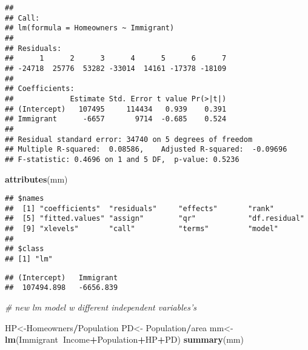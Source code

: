 \documentclass[
]{article}
\newenvironment{Shaded}{\begin{snugshade}}{\end{snugshade}}
\newcommand{\CommentTok}[1]{\textcolor[rgb]{0.56,0.35,0.01}{\textit{#1}}}
\newcommand{\KeywordTok}[1]{\textcolor[rgb]{0.13,0.29,0.53}{\textbf{#1}}}
\newcommand{\NormalTok}[1]{#1}
\newcommand{\OperatorTok}[1]{\textcolor[rgb]{0.81,0.36,0.00}{\textbf{#1}}}
\newcommand{\StringTok}[1]{\textcolor[rgb]{0.31,0.60,0.02}{#1}}
\begin{document}
\begin{verbatim}
## 
## Call:
## lm(formula = Homeowners ~ Immigrant)
## 
## Residuals:
##      1      2      3      4      5      6      7 
## -24718  25776  53282 -33014  14161 -17378 -18109 
## 
## Coefficients:
##             Estimate Std. Error t value Pr(>|t|)
## (Intercept)   107495     114434   0.939    0.391
## Immigrant      -6657       9714  -0.685    0.524
## 
## Residual standard error: 34740 on 5 degrees of freedom
## Multiple R-squared:  0.08586,    Adjusted R-squared:  -0.09696 
## F-statistic: 0.4696 on 1 and 5 DF,  p-value: 0.5236
\end{verbatim}

\begin{Shaded}
\begin{Highlighting}[]
\KeywordTok{attributes}\NormalTok{(mm)}
\end{Highlighting}
\end{Shaded}

\begin{verbatim}
## $names
##  [1] "coefficients"  "residuals"     "effects"       "rank"         
##  [5] "fitted.values" "assign"        "qr"            "df.residual"  
##  [9] "xlevels"       "call"          "terms"         "model"        
## 
## $class
## [1] "lm"
\end{verbatim}

\begin{Shaded}
\end{Shaded}

\begin{verbatim}
## (Intercept)   Immigrant 
##  107494.898   -6656.839
\end{verbatim}

\begin{Shaded}
\begin{Highlighting}[]
\CommentTok{# new lm model w different independent variables's}

\NormalTok{HP<-Homeowners}\OperatorTok{/}\NormalTok{Population}
\NormalTok{PD<-}\StringTok{ }\NormalTok{Population}\OperatorTok{/}\NormalTok{area}
\NormalTok{mm<-}\StringTok{ }\KeywordTok{lm}\NormalTok{(Immigrant}\OperatorTok{~}\NormalTok{Income}\OperatorTok{+}\NormalTok{Population}\OperatorTok{+}\NormalTok{HP}\OperatorTok{+}\NormalTok{PD)}
\KeywordTok{summary}\NormalTok{(mm)}
\end{Highlighting}
\end{Shaded}
\end{document}
